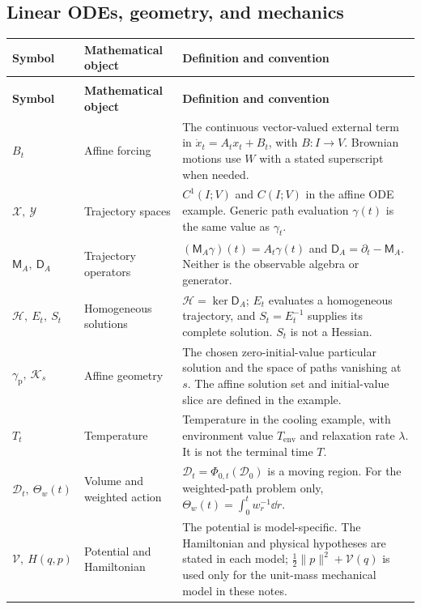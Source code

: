 \subsection*{Linear ODEs, geometry, and mechanics}
\begingroup
\small
{}
\setlength{\tabcolsep}{4pt}
\renewcommand{\arraystretch}{1.16}
\begin{longtable}{@{}>{\raggedright\arraybackslash}p{32mm}>{\raggedright\arraybackslash}p{26mm}>{\raggedright\arraybackslash}p{90mm}@{}}
\toprule
\textbf{Symbol} & \textbf{Mathematical object} & \textbf{Definition and convention}\\
\midrule
\endfirsthead
\multicolumn{3}{@{}l}{\small\itshape Linear ODEs, geometry, and mechanics (continued)}\\[3pt]
\toprule
\textbf{Symbol} & \textbf{Mathematical object} & \textbf{Definition and convention}\\
\midrule
\endhead
\bottomrule
\endfoot
$B_t$ & Affine forcing & The continuous vector-valued external term in $\dot x_t=A_tx_t+B_t$, with $B:I\to V$. Brownian motions use $W$ with a stated superscript when needed.\\[3pt]
$\mathcal X,\ \mathcal Y$ & Trajectory spaces & $C^1(I;V)$ and $C(I;V)$ in the affine ODE example. Generic path evaluation $\gamma(t)$ is the same value as $\gamma_t$.\\[3pt]
$\mathsf M_A,\ \mathsf D_A$ & Trajectory operators & $(\mathsf M_A\gamma)(t)=A_t\gamma(t)$ and $\mathsf D_A=\partial_t-\mathsf M_A$. Neither is the observable algebra or generator.\\[3pt]
$\mathcal H,\ E_t,\ S_t$ & Homogeneous solutions & $\mathcal H=\ker\mathsf D_A$; $E_t$ evaluates a homogeneous trajectory, and $S_t=E_t^{-1}$ supplies its complete solution. $S_t$ is not a Hessian.\\[3pt]
$\gamma_{\mathrm p},\ \mathcal K_s$ & Affine geometry & The chosen zero-initial-value particular solution and the space of paths vanishing at $s$. The affine solution set and initial-value slice are defined in the example.\\[3pt]
$T_t$ & Temperature & Temperature in the cooling example, with environment value $T_{\mathrm{env}}$ and relaxation rate $\lambda$. It is not the terminal time $T$.\\[3pt]
$\mathcal D_t,\ \Theta_w(t)$ & Volume and weighted action & $\mathcal D_t=\Phi_{0,t}(\mathcal D_0)$ is a moving region. For the weighted-path problem only, $\Theta_w(t)=\int_0^t w_r^{-1}\dd r$.\\[3pt]
$\mathcal V,\ H(q,p)$ & Potential and Hamiltonian & The potential is model-specific. The Hamiltonian and physical hypotheses are stated in each model; $\frac12\|p\|^2+\mathcal V(q)$ is used only for the unit-mass mechanical model in these notes.\\[3pt]

\end{longtable}
